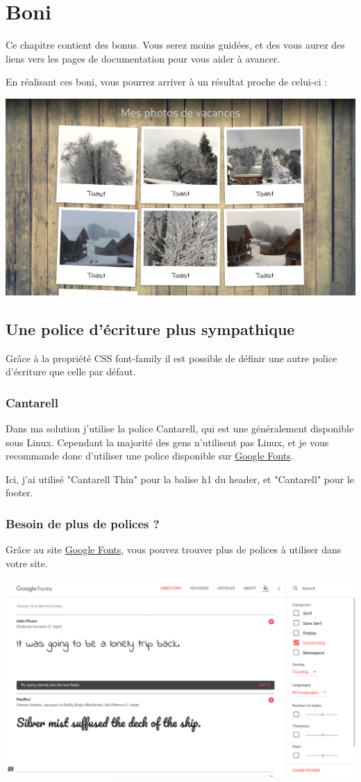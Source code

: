\section{Boni}
Ce chapitre contient des bonus. Vous serez moins guidées, et des vous aurez des
liens vers les pages de documentation pour vous aider à avancer.

En réalisant ces boni, vous pourrez arriver à un résultat proche de celui-ci :
\begin{center}\includegraphics[width=.8\linewidth]{img/screenshot_final.png}\end{center}

\subsection{Une police d'écriture plus sympathique}
Grâce à la propriété CSS font-family il est possible de définir une autre police
d'écriture que celle par défaut.
\subsubsection{Cantarell}
Dans ma solution j'utilise la police Cantarell, qui est une généralement
disponible sous Linux. Cependant la majorité des gens n'utilisent pas Linux, et
je vous recommande donc d'utiliser une police disponible sur \href{https://fonts.google.com}{Google Fonts}.

Ici, j'ai utilisé "Cantarell Thin" pour la balise h1 du header, et "Cantarell"
pour le footer.
\subsubsection{Besoin de plus de polices ?}
Grâce au site \href{https://fonts.google.com}{Google Fonts}, vous pouvez trouver
plus de polices à utiliser dans votre site.

\begin{center}\includegraphics[width=.8\linewidth]{img/screenshot_google_fonts.png}\end{center}

